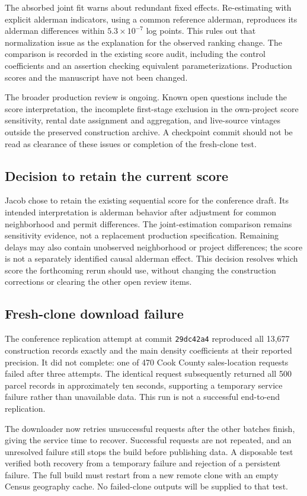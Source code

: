 The absorbed joint fit warns about redundant fixed effects. Re-estimating with
explicit alderman indicators, using a common reference alderman, reproduces its
alderman differences within $5.3\times10^{-7}$ log points. This rules out that
normalization issue as the explanation for the observed ranking change. The
comparison is recorded in the existing score audit, including the control
coefficients and an assertion checking equivalent parameterizations. Production
scores and the manuscript have not been changed.

The broader production review is ongoing. Known open questions include the
score interpretation, the incomplete first-stage exclusion in the own-project
score sensitivity, rental date assignment and aggregation, and live-source
vintages outside the preserved construction archive. A checkpoint commit should
not be read as clearance of these issues or completion of the fresh-clone test.

\subsection*{Decision to retain the current score}
Jacob chose to retain the existing sequential score for the conference draft.
Its intended interpretation is alderman behavior after adjustment for common
neighborhood and permit differences. The joint-estimation comparison remains
sensitivity evidence, not a replacement production specification. Remaining
delays may also contain unobserved neighborhood or project differences; the
score is not a separately identified causal alderman effect. This decision
resolves which score the forthcoming rerun should use, without changing the
construction corrections or clearing the other open review items.

\subsection*{Fresh-clone download failure}
The conference replication attempt at commit \texttt{29dc42a4} reproduced all
13,677 construction records exactly and the main density coefficients at their
reported precision. It did not complete: one of 470 Cook County sales-location
requests failed after three attempts. The identical request subsequently returned
all 500 parcel records in approximately ten seconds, supporting a temporary
service failure rather than unavailable data. This run is not a successful
end-to-end replication.

The downloader now retries unsuccessful requests after the other batches finish,
giving the service time to recover. Successful requests are not repeated, and
an unresolved failure still stops the build before publishing data. A disposable
test verified both recovery from a temporary failure and rejection of a persistent
failure. The full build must restart from a new remote clone with an empty Census
geography cache. No failed-clone outputs will be supplied to that test.

